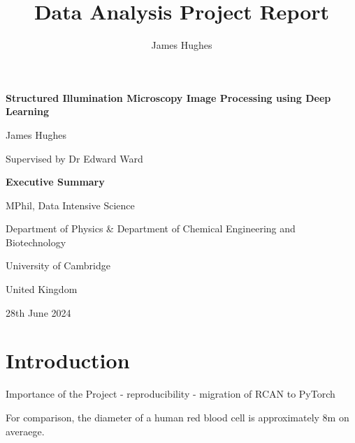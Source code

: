 \documentclass[12pt]{article}
\title{Data Analysis Project Report}
\author{James Hughes}
\begin{document}
\begin{titlepage}
    \begin{center}
        \vspace*{1cm}

        \Huge
        \textbf{Structured Illumination Microscopy Image Processing using Deep Learning}

        \vspace{0.5cm}
        \LARGE

        James Hughes

        Supervised by Dr Edward Ward

        \vspace{2cm}
        \Huge
        \textbf{Executive Summary}

        \vfill

        MPhil, Data Intensive Science

        \vspace{0.8cm}

        \Large
        Department of Physics \& Department of Chemical Engineering and Biotechnology

        University of Cambridge

        United Kingdom

        28th June 2024

    \end{center}
\end{titlepage}

\newpage

\newpage
\section{Introduction}

Importance of the Project
- reproducibility
- migration of RCAN to PyTorch

For comparison, the diameter of a human red blood cell is approximately 8\textmu m on averaege.
\end{document}
